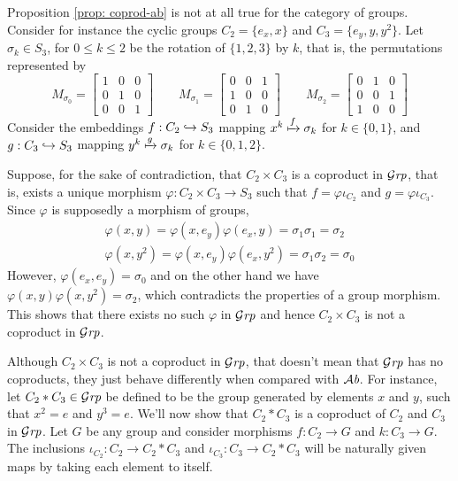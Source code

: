 \begin{remark}
  Proposition \ref{prop: coprod-ab} is not at all true for the category of
  groups. Consider for instance the cyclic groups \(C_2 = \{e_x, x\}\) and \(C_3
  = \{e_y, y, y^2\}\). Let \(\sigma_k \in S_3\), for \(0 \leq k \leq 2\) be the
  rotation of \(\{1, 2, 3\}\) by \(k\), that is, the permutations represented by
  \[
    M_{\sigma_0} =
    \begin{bmatrix}
      1 &0 &0 \\ 0 &1 &0 \\ 0 &0 &1
    \end{bmatrix}
    \qquad
    M_{\sigma_1} =
    \begin{bmatrix}
      0 &0 &1 \\ 1 &0 &0 \\ 0 &1 &0
    \end{bmatrix}
    \qquad
    M_{\sigma_2} =
    \begin{bmatrix}
      0 &1 &0 \\ 0 &0 &1 \\ 1 &0 &0
    \end{bmatrix}
  \]
  Consider the embeddings \(f: C_2 \hookrightarrow S_3\) mapping \(x^k \xmapsto f
  \sigma_k\) for \(k \in \{0, 1\}\), and \(g: C_3 \hookrightarrow S_3\) mapping \(y^k
  \xmapsto g \sigma_k\) for \(k \in \{0, 1, 2\}\).

  Suppose, for the sake of contradiction, that \(C_2 \times C_3\) is a coproduct
  in \({\mathcal{G}\textit{rp}}\), that is, exists a unique morphism \(\varphi: C_2 \times C_3 \to
  S_3\) such that \(f = \varphi \iota_{C_2}\) and \(g = \varphi \iota_{C_3}\).
  Since \(\varphi\) is supposedly a morphism of groups,
  \begin{gather*}
    \varphi(x, y) = \varphi(x, e_y) \varphi(e_x, y) = \sigma_1 \sigma_1 =
    \sigma_2 \\
    \varphi(x, y^2) = \varphi(x, e_y) \varphi(e_x, y^2) = \sigma_1 \sigma_2
    = \sigma_0
  \end{gather*}
  However, \(\varphi(e_x, e_y) = \sigma_0\) and on the other hand we have
  \(\varphi(x, y) \varphi(x, y^2) = \sigma_2\), which contradicts the properties
  of a group morphism. This shows that there exists no such \(\varphi\) in
  \({\mathcal{G}\textit{rp}}\) and hence \(C_2 \times C_3\) is not a coproduct in \({\mathcal{G}\textit{rp}}\).

  Although \(C_2 \times C_3\) is not a coproduct in \({\mathcal{G}\textit{rp}}\), that doesn't mean
  that \({\mathcal{G}\textit{rp}}\) has no coproducts, they just behave differently when compared
  with \({\mathcal{A}\textit{b}}\). For instance, let \(C_2 * C_3 \in {\mathcal{G}\textit{rp}}\) be defined to be the
  group generated by elements \(x\) and \(y\), such that \(x^2 = e\) and \(y^3 =
  e\). We'll now show that \(C_2 * C_3\) is a coproduct of \(C_2\) and \(C_3\)
  in \({\mathcal{G}\textit{rp}}\). Let \(G\) be any group and consider morphisms \(f: C_2 \to G\)
  and \(k: C_3 \to G\). The inclusions \(\iota_{C_2}: C_2 \to C_2 * C_3\) and
  \(\iota_{C_3}: C_3 \to C_2 * C_3\) will be naturally given maps by taking each
  element to itself.


\end{remark}
